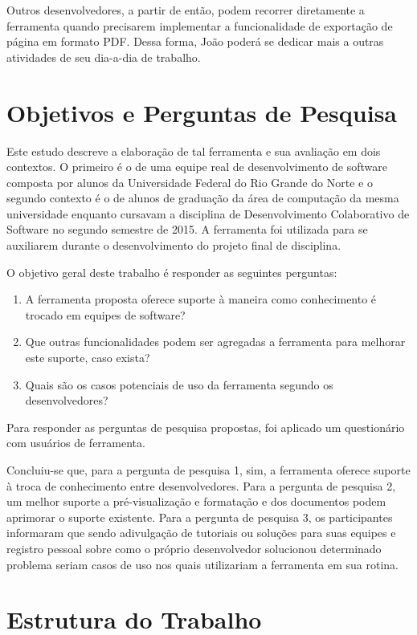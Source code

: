 Outros desenvolvedores, a partir de então, podem recorrer diretamente a ferramenta quando precisarem implementar a funcionalidade de exportação de página em formato PDF. Dessa forma, João poderá se dedicar mais a outras atividades de seu dia-a-dia de trabalho.

\section{Objetivos e Perguntas de Pesquisa}

Este estudo descreve a elaboração de tal ferramenta e sua avaliação em dois contextos. O primeiro é o de uma equipe real de desenvolvimento de software composta por alunos da Universidade Federal do Rio Grande do Norte e o segundo contexto é o de alunos de graduação da área de computação da mesma universidade enquanto cursavam a disciplina de Desenvolvimento Colaborativo de Software no segundo semestre de 2015. A ferramenta foi utilizada para se auxiliarem durante o desenvolvimento do projeto final de disciplina.

O objetivo geral deste trabalho é responder as seguintes perguntas:

\begin{enumerate}
  \item A ferramenta proposta oferece suporte à maneira como conhecimento é trocado em equipes de software?
  \item Que outras funcionalidades podem ser agregadas a ferramenta para melhorar este suporte, caso exista?
  \item Quais são os casos potenciais de uso da ferramenta segundo os desenvolvedores?
\end{enumerate}

Para responder as perguntas de pesquisa propostas, foi aplicado um questionário com usuários de ferramenta.

Concluiu-se que, para a pergunta de pesquisa 1, sim, a ferramenta oferece suporte à troca de conhecimento entre desenvolvedores. Para a pergunta de pesquisa 2, um melhor suporte a pré-visualização e formatação e dos documentos podem aprimorar o suporte existente. Para a pergunta de pesquisa 3, os participantes informaram que sendo adivulgação de tutoriais ou soluções para suas equipes e registro pessoal sobre como o próprio desenvolvedor solucionou determinado problema seriam casos de uso nos quais utilizariam a ferramenta em sua rotina.

\section{Estrutura do Trabalho}

